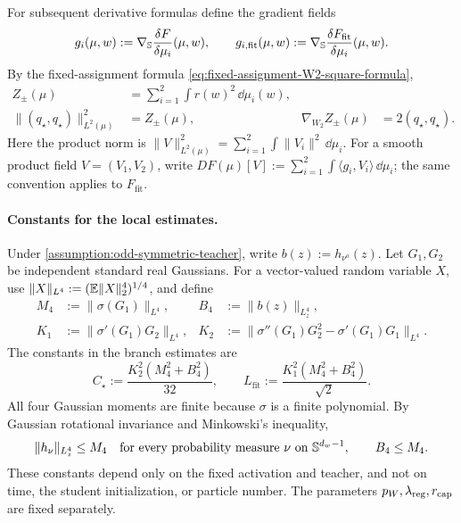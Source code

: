 For subsequent derivative formulas define the gradient fields
\begin{equation}
\label{eq:mf-branch-radial-notation}
 g_i(\mu,w):=\nabla_{\mathbb{S}}\frac{\delta F}{\delta\mu_i}(\mu,w),
 \qquad
 g_{i,\mathrm{fit}}(\mu,w):=\nabla_{\mathbb{S}}
                  \frac{\delta F_{\mathrm{fit}}}{\delta\mu_i}(\mu,w).
\end{equation}
By the fixed-assignment formula \cref{eq:fixed-assignment-W2-square-formula},
\begin{equation}
\label{eq:mf-branch-distance-gradient}
\begin{aligned}
 Z_\pm(\mu)&=\sum_{i=1}^2\int r(w)^2\,\dd\mu_i(w),\\
 \|(q_\star,q_\star)\|_{L^2(\mu)}^2&=Z_\pm(\mu),
 &\nabla_{W_2}Z_\pm(\mu)&=2(q_\star,q_\star).
\end{aligned}
\end{equation}
Here the product norm is
\(\|V\|_{L^2(\mu)}^2=\sum_{i=1}^2\int\|V_i\|^2\,\dd\mu_i\).
For a smooth product field \(V=(V_1,V_2)\), write
\(DF(\mu)[V]:=\sum_{i=1}^2\int\langle g_i,V_i\rangle\,\dd\mu_i\);
the same convention applies to \(F_{\mathrm{fit}}\).

\paragraph{Constants for the local estimates.}
Under \cref{assumption:odd-symmetric-teacher}, write
\(b(z):=h_{\nu^o}(z)\). Let \(G_1,G_2\) be independent standard real
Gaussians. For a vector-valued random variable \(X\), use
\(\|X\|_{L^4}:=(\mathbb{E}\|X\|_2^4)^{1/4}\), and define
\begin{equation}
\label{eq:mf-gaussian-derivative-constants}
\begin{aligned}
 M_4&:=\|\sigma(G_1)\|_{L^4},
 &B_4&:=\|b(z)\|_{L^4_z},\\
 K_1&:=\|\sigma'(G_1)G_2\|_{L^4},
 &K_2&:=\|\sigma''(G_1)G_2^2-\sigma'(G_1)G_1\|_{L^4}.
\end{aligned}
\end{equation}
The constants in the branch estimates are
\begin{equation}
\label{eq:mf-branch-estimate-constants}
 C_\star:=\frac{K_2^2(M_4^2+B_4^2)}{32},
 \qquad
 L_{\mathrm{fit}}:=\frac{K_1^2(M_4^2+B_4^2)}{\sqrt{2}}.
\end{equation}
All four Gaussian moments are finite because \(\sigma\) is a finite
polynomial. By Gaussian rotational invariance and Minkowski's inequality,
\begin{equation}
\label{eq:mf-output-fourth-moment-bound}
 \|h_\nu\|_{L^4_z}\le M_4
 \quad\text{for every probability measure \(\nu\) on \(\mathbb{S}^{d_w-1}\)},
 \qquad B_4\le M_4.
\end{equation}
These constants depend only on the fixed activation and teacher, and not on
time, the student initialization, or particle number. The parameters
\(p_W,\lambda_{\mathrm{reg}},r_{\mathrm{cap}}\) are fixed separately.

